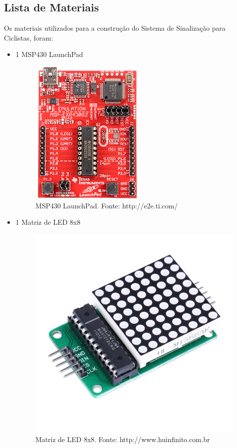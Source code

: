 \documentclass[conference]{IEEEtran}
\begin{document}
\subsection{Lista de Materiais}
Os materiais utilizados para a construção do Sistema de Sinalização para Ciclistas, foram:
\begin{itemize}
	\item 1 MSP430 LaunchPad
	\begin{figure}[!ht]
		\centering
		\includegraphics[width=0.7\linewidth]{MSP430-LaunchPad}
		\caption{MSP430 LaunchPad. Fonte: http://e2e.ti.com/}
		\label{fig:2500}
	\end{figure}
	
	\item 1 Matriz de LED 8x8
	\begin{figure}
		\centering
		\includegraphics[width=0.7\linewidth]{matriz}
		\caption{Matriz de LED 8x8. Fonte: http://www.huinfinito.com.br}
		\label{fig:matriz}
	\end{figure}
	

\end{itemize}
\end{document}
